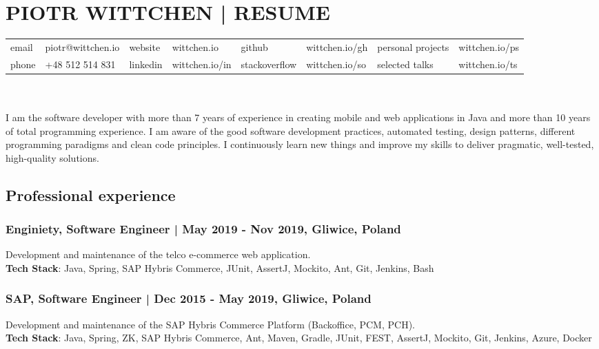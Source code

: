 \documentclass[8pt]{extarticle}
\begin{document}
  \small

  \section*{\large{PIOTR WITTCHEN | RESUME}}

  \begin{tabular}{llllllll}
      email  & piotr@wittchen.io & website  & wittchen.io    & github        & wittchen.io/gh & personal projects & wittchen.io/ps \\
      phone  & +48 512 514 831   & linkedin & wittchen.io/in & stackoverflow & wittchen.io/so & selected talks    & wittchen.io/ts \\
  \end{tabular} \\ \\

    I am the software developer with more than 7 years of experience in creating mobile and web applications in Java and more than 10 years of total programming experience. I am aware of the good software development practices, automated testing, design patterns, different programming paradigms and clean code principles. I continuously learn new things and improve my skills to deliver pragmatic, well-tested, high-quality solutions.

    \subsection*{\normalsize{Professional experience}}

      \subsubsection*{\normalsize{Enginiety, Software Engineer | May 2019 - Nov 2019, Gliwice, Poland}}
      Development and maintenance of the telco e-commerce web application.\\
      \textbf{Tech Stack}: Java, Spring, SAP Hybris Commerce, JUnit, AssertJ, Mockito, Ant, Git, Jenkins, Bash

      \subsubsection*{\normalsize{SAP, Software Engineer | Dec 2015 - May 2019, Gliwice, Poland}}
      Development and maintenance of the SAP Hybris Commerce Platform (Backoffice, PCM, PCH).\\
      \textbf{Tech Stack}: Java, Spring, ZK, SAP Hybris Commerce, Ant, Maven, Gradle,
      JUnit, FEST, AssertJ, Mockito, Git, Jenkins, Azure, Docker
\end{document}
